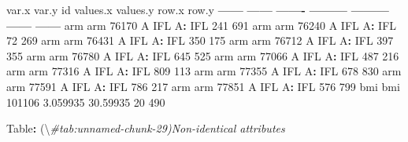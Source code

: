 \documentclass[
]{book}
\newenvironment{Shaded}{\begin{snugshade}}{\end{snugshade}}
\newcommand{\CommentTok}[1]{\textcolor[rgb]{0.56,0.35,0.01}{\textit{#1}}}
\newcommand{\DecValTok}[1]{\textcolor[rgb]{0.00,0.00,0.81}{#1}}
\newcommand{\FloatTok}[1]{\textcolor[rgb]{0.00,0.00,0.81}{#1}}
\newcommand{\NormalTok}[1]{#1}
\newcommand{\OperatorTok}[1]{\textcolor[rgb]{0.81,0.36,0.00}{\textbf{#1}}}
\newcommand{\StringTok}[1]{\textcolor[rgb]{0.31,0.60,0.02}{#1}}
\begin{document}
\begin{Shaded}
\begin{Highlighting}[]
\NormalTok{var.x   var.y        id  values.x   values.y    row.x   row.y}
\OperatorTok{------}\StringTok{  }\OperatorTok{------}\StringTok{  }\OperatorTok{-------}\StringTok{  }\OperatorTok{---------}\StringTok{  }\OperatorTok{---------}\StringTok{  }\OperatorTok{------}\StringTok{  }\OperatorTok{------}
\NormalTok{arm     arm       }\DecValTok{76170}\NormalTok{  A IFL      A}\OperatorTok{:}\StringTok{ }\NormalTok{IFL        }\DecValTok{241}     \DecValTok{691}
\NormalTok{arm     arm       }\DecValTok{76240}\NormalTok{  A IFL      A}\OperatorTok{:}\StringTok{ }\NormalTok{IFL         }\DecValTok{72}     \DecValTok{269}
\NormalTok{arm     arm       }\DecValTok{76431}\NormalTok{  A IFL      A}\OperatorTok{:}\StringTok{ }\NormalTok{IFL        }\DecValTok{350}     \DecValTok{175}
\NormalTok{arm     arm       }\DecValTok{76712}\NormalTok{  A IFL      A}\OperatorTok{:}\StringTok{ }\NormalTok{IFL        }\DecValTok{397}     \DecValTok{355}
\NormalTok{arm     arm       }\DecValTok{76780}\NormalTok{  A IFL      A}\OperatorTok{:}\StringTok{ }\NormalTok{IFL        }\DecValTok{645}     \DecValTok{525}
\NormalTok{arm     arm       }\DecValTok{77066}\NormalTok{  A IFL      A}\OperatorTok{:}\StringTok{ }\NormalTok{IFL        }\DecValTok{487}     \DecValTok{216}
\NormalTok{arm     arm       }\DecValTok{77316}\NormalTok{  A IFL      A}\OperatorTok{:}\StringTok{ }\NormalTok{IFL        }\DecValTok{809}     \DecValTok{113}
\NormalTok{arm     arm       }\DecValTok{77355}\NormalTok{  A IFL      A}\OperatorTok{:}\StringTok{ }\NormalTok{IFL        }\DecValTok{678}     \DecValTok{830}
\NormalTok{arm     arm       }\DecValTok{77591}\NormalTok{  A IFL      A}\OperatorTok{:}\StringTok{ }\NormalTok{IFL        }\DecValTok{786}     \DecValTok{217}
\NormalTok{arm     arm       }\DecValTok{77851}\NormalTok{  A IFL      A}\OperatorTok{:}\StringTok{ }\NormalTok{IFL        }\DecValTok{576}     \DecValTok{799}
\NormalTok{bmi     bmi      }\DecValTok{101106}  \FloatTok{3.059935}   \FloatTok{30.59935}       \DecValTok{20}     \DecValTok{490}



\NormalTok{Table}\OperatorTok{:}\StringTok{ }\NormalTok{(\textbackslash{}}\CommentTok{#tab:unnamed-chunk-29)Non-identical attributes}


\end{Highlighting}
\end{Shaded}
\end{document}
